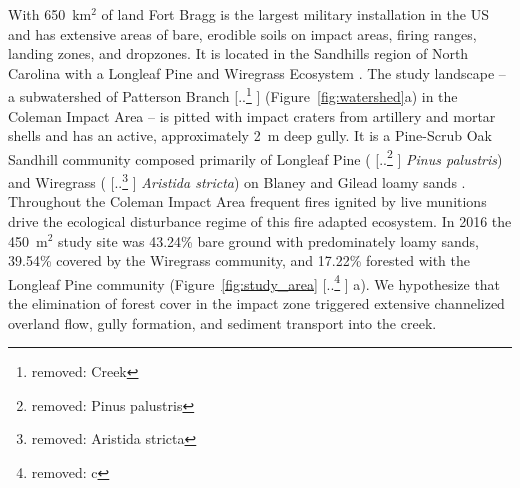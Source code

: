 \documentclass[gmd, manuscript]{copernicus}
\providecommand{\DIFadd}[1]{{\protect\color{blue} \sf #1}} %
\providecommand{\DIFdel}[1]{{\protect\color{red} [..\footnote{removed: #1} ]}} %
\providecommand{\DIFaddbegin}{} %
\providecommand{\DIFaddend}{} %
\providecommand{\DIFdelbegin}{} %
\providecommand{\DIFdelend}{} %
\begin{document}
With 650~\unit{km}$^{2}$ of land
Fort Bragg is the largest military installation in the US
and has extensive areas of bare, erodible soils
on impact areas, firing ranges, landing zones, and dropzones. 
It is located in the Sandhills region of North Carolina 
with a Longleaf Pine and Wiregrass Ecosystem \citep{Sorrie2006}.
%
The study landscape 
-- a subwatershed of Patterson Branch \DIFdelbegin \DIFdel{Creek 
}\DIFdelend \DIFaddbegin \DIFadd{(Figure~\ref{fig:watershed}a) 
}\DIFaddend in the Coleman Impact Area --
is pitted with impact craters from artillery and mortar shells
and has an active, approximately 2~\unit{m} deep gully. 
%
It is a Pine-Scrub Oak Sandhill community
composed primarily of Longleaf Pine (\DIFdelbegin \DIFdel{Pinus palustris}\DIFdelend \DIFaddbegin \DIFadd{\emph{Pinus palustris}}\DIFaddend )
and Wiregrass (\DIFdelbegin \DIFdel{Aristida stricta}\DIFdelend \DIFaddbegin \DIFadd{\emph{Aristida stricta}}\DIFaddend )
on Blaney and Gilead loamy sands 
\citep{Sorrie2004}. 
%
Throughout the Coleman Impact Area
frequent fires ignited by live munitions
drive the ecological disturbance regime
of this fire adapted ecosystem.
%
In 2016 the  450~\unit{m}$^{2}$ study site was
43.24\% bare ground with predominately loamy sands,
39.54\% covered by the Wiregrass community, and
17.22\% forested with the Longleaf Pine community 
(Figure~\ref{fig:study_area}\DIFdelbegin \DIFdel{c}\DIFdelend \DIFaddbegin \DIFadd{a}\DIFaddend ). 
%
We hypothesize that the elimination of forest cover
in the impact zone
triggered extensive channelized overland flow,
gully formation, and sediment transport into the creek. 
\end{document}
